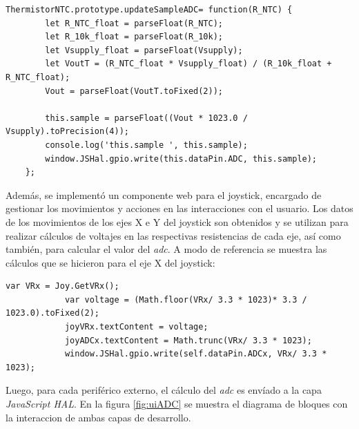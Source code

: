 \begin{lstlisting}[caption={Cálculo ADC del termistor NTC.}]
     ThermistorNTC.prototype.updateSampleADC= function(R_NTC) {
        let R_NTC_float = parseFloat(R_NTC);
        let R_10k_float = parseFloat(R_10k);
        let Vsupply_float = parseFloat(Vsupply);    
        let VoutT = (R_NTC_float * Vsupply_float) / (R_10k_float + R_NTC_float);
        Vout = parseFloat(VoutT.toFixed(2)); 

        this.sample = parseFloat((Vout * 1023.0 / Vsupply).toPrecision(4));
        console.log('this.sample ', this.sample);
        window.JSHal.gpio.write(this.dataPin.ADC, this.sample);     
    };
\end{lstlisting}

Además, se implementó un componente web para el joystick, encargado de gestionar los movimientos y acciones en las interacciones con el usuario. Los datos de los movimientos de los ejes X e Y del joystick son obtenidos y se utilizan para realizar cálculos de voltajes en las respectivas resistencias de cada eje, así como también, para calcular el valor del \textit{adc}. A modo de referencia se muestra las cálculos que se hicieron para el eje X del joystick:

\begin{lstlisting}[caption={Cálculo de la resistencia del eje X y del ADC.}]
            var VRx = Joy.GetVRx();
            var voltage = (Math.floor(VRx/ 3.3 * 1023)* 3.3 / 1023.0).toFixed(2);
            joyVRx.textContent = voltage;
            joyADCx.textContent = Math.trunc(VRx/ 3.3 * 1023);
            window.JSHal.gpio.write(self.dataPin.ADCx, VRx/ 3.3 * 1023);
\end{lstlisting}

Luego, para cada periférico externo, el cálculo del \textit{adc} es envíado a la capa \textit{JavaScript HAL}.
En la figura \ref{fig:uiADC} se muestra el diagrama de bloques con la interaccion de ambas capas de desarrollo.

